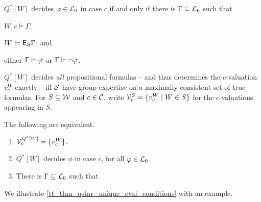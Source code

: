 \begin{theorem}
    \label{tt_thm_decide_phi}
    $Q^*[W]$ decides $\varphi \in \mathcal{L}_0$ in case $c$ if and only if there is
    $\Gamma \subseteq \mathcal{L}_0$ such that
    \begin{inlinelist}
        \item $W, c \models \Gamma$;
        \item $W \models \mathsf{E}_{\mathcal{S}}{\Gamma}$; and
        \item either $\Gamma \Vdash \varphi$ or $\Gamma \Vdash
              \neg\varphi$.
    \end{inlinelist}
\end{theorem}

$Q^*[W]$ decides \emph{all} propositional formulas -- and thus determines the
$c$-valuation $v^W_c$ exactly -- iff $\mathcal{S}$ have group expertise on a
maximally consistent set of true formulas. For $S \subseteq \mathcal{W}$ and $c \in
\mathcal{C}$, write $\mathcal{V}^S_c = \{v^W_c \mid W \in S\}$ for the $c$-valuations
appearing in $S$.

\begin{theorem}
    \label{tt_thm_qstar_unique_cval_conditions}
    The following are equivalent.
    \begin{enumerate}
        \item\label{tt_item_uniqueval} $\mathcal{V}^{Q^*[W]}_c = \{v^W_c\}$.
        \item\label{tt_item_define_all_phi} $Q^*[W]$ decides $\phi$ in case $c$,
            for all $\varphi \in \mathcal{L}_0$.
        \item\label{tt_item_mcs_gamma} There is $\Gamma \subseteq \mathcal{L}_0$ such
            that
    \end{enumerate}
\end{theorem}

We illustrate \cref{tt_thm_qstar_unique_cval_conditions} with an example.

